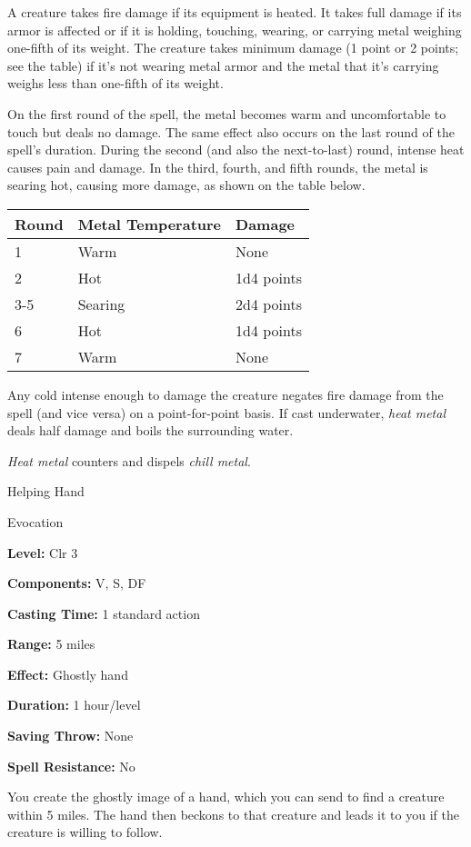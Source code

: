 \documentclass{article}
\begin{document}
A creature takes fire damage if its equipment is heated. It takes full damage if 
its armor is affected or if it is holding, touching, wearing, or carrying metal 
weighing one-fifth of its weight. The creature takes minimum damage (1 point or 
2 points; see the table) if it's not wearing metal armor and the metal that it's 
carrying weighs less than one-fifth of its weight.

On the first round of the spell, the metal becomes warm and uncomfortable to touch 
but deals no damage. The same effect also occurs on the last round of the spell's 
duration. During the second (and also the next-to-last) round, intense heat causes 
pain and damage. In the third, fourth, and fifth rounds, the metal is searing hot, 
causing more damage, as shown on the table below.

\begin{tabular}{|>{\raggedright}p{27pt}|>{\raggedright}p{82pt}|>{\raggedright}p{40pt}|}
\hline
R\textbf{ound} & M\textbf{etal Temperature} & D\textbf{amage}\tabularnewline
\hline
1 & Warm & None\tabularnewline
\hline
2 & Hot & 1d4 points\tabularnewline
\hline
3-5 & Searing & 2d4 points\tabularnewline
\hline
6 & Hot & 1d4 points\tabularnewline
\hline
7 & Warm & None\tabularnewline
\hline
\end{tabular}

Any cold intense enough to damage the creature negates fire damage from the spell 
(and vice versa) on a point-for-point basis. If cast underwater, \textit{heat metal 
}deals half damage and boils the surrounding water.

\textit{Heat metal }counters and dispels \textit{chill metal}.

\vspace{12pt}
Helping Hand

Evocation

\textbf{Level:} Clr 3

\textbf{Components:} V, S, DF

\textbf{Casting Time:} 1 standard action

\textbf{Range:} 5 miles

\textbf{Effect:} Ghostly hand

\textbf{Duration:} 1 hour/level

\textbf{Saving Throw:} None

\textbf{Spell Resistance:} No

You create the ghostly image of a hand, which you can send to find a creature within 
5 miles. The hand then beckons to that creature and leads it to you if the creature 
is willing to follow.
\end{document}
